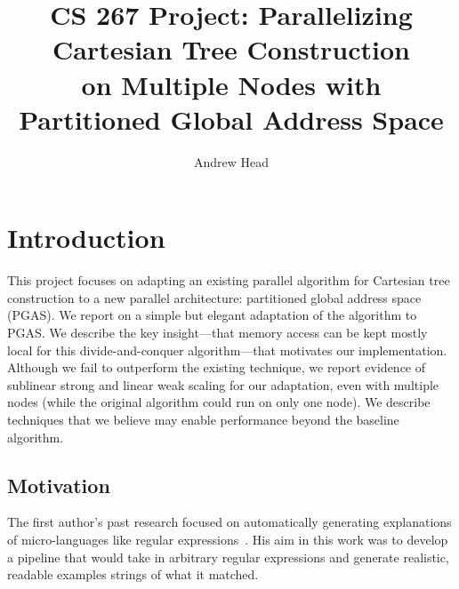\documentclass[10pt]{article}
\begin{document}
\title{\Large CS 267 Project: Parallelizing Cartesian Tree Construction \\ 
on Multiple Nodes with Partitioned Global Address Space}
\author{\large Andrew Head}
\date{}
\maketitle



\vspace{-5ex}

\section{Introduction}

This project focuses on adapting an existing parallel algorithm for Cartesian tree construction to
a new parallel architecture: partitioned global address space (PGAS).
We report on a simple but elegant adaptation of the algorithm to PGAS\@.
We describe the key insight---that memory access can be kept mostly local for this
divide-and-conquer algorithm---that motivates our implementation.
Although we fail to outperform the existing technique, we report evidence of sublinear strong and
linear weak scaling for our adaptation, even with multiple nodes (while the original algorithm could run
on only one node).
We describe techniques that we believe may enable performance beyond the baseline algorithm.

\subsection{Motivation}

The first author's past research focused on automatically generating explanations of
micro-languages like regular expressions~\cite{head_tutorons_2015}.
His aim in this work was to develop a pipeline that would take in arbitrary regular expressions and generate
realistic, readable examples strings of what it matched.
\end{document}
